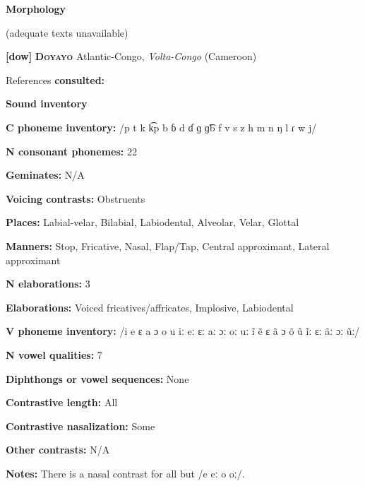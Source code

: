 \textbf{Morphology}



(adequate texts unavailable)



\textbf{[dow]}   \textbf{\textsc{Doyayo}}    Atlantic-Congo, \textit{Volta-Congo} (Cameroon)



References \textbf{consulted:} \citet{WieringWiering1994}



\textbf{Sound inventory}



\textbf{C phoneme inventory:} /p t k k͡p b ɓ d ɗ ɡ ɡ͡b f v s z h m n ŋ l ɾ w j/



\textbf{N consonant phonemes:} 22



\textbf{Geminates:} N/A



\textbf{Voicing contrasts:} Obstruents



\textbf{Places:} Labial-velar, Bilabial, Labiodental, Alveolar, Velar, Glottal



\textbf{Manners:} Stop, Fricative, Nasal, Flap/Tap, Central approximant, Lateral approximant



\textbf{N elaborations:} 3



\textbf{Elaborations:} Voiced fricatives/affricates, Implosive, Labiodental



\textbf{V phoneme inventory:} /i e ɛ a ɔ o u iː eː ɛː aː ɔː oː uː ĩ ẽ ɛ ã ɔ õ ũ ĩː ɛː ãː ɔː ũː/



\textbf{N vowel qualities:} 7



\textbf{Diphthongs or vowel sequences:} None



\textbf{Contrastive length:} All



\textbf{Contrastive nasalization:} Some



\textbf{Other contrasts:} N/A



\textbf{Notes:} There is a nasal contrast for all but /e eː o oː/.



